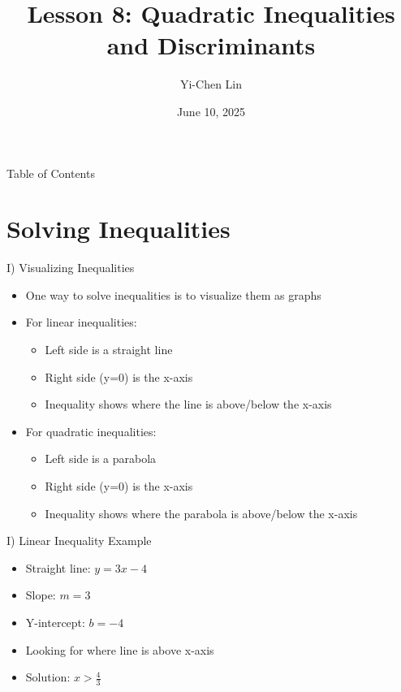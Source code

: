 \documentclass[aspectratio=169]{beamer}
\title{Lesson 8: Quadratic Inequalities and Discriminants}
\author{Yi-Chen Lin}
\date{June 10, 2025}
\begin{document}
\begin{frame}
    \titlepage
\end{frame}

\begin{frame}{Table of Contents}
    \tableofcontents
\end{frame}

\section{Solving Inequalities}

\begin{frame}{I) Visualizing Inequalities}
    \begin{tcolorbox}[colback=lightgray,colframe=primary,title=Key Concept]
        \footnotesize
        \begin{itemize}
            \item One way to solve inequalities is to visualize them as graphs
            \item For linear inequalities:
            \begin{itemize}
                \item Left side is a straight line
                \item Right side (y=0) is the x-axis
                \item Inequality shows where the line is above/below the x-axis
            \end{itemize}
            \item For quadratic inequalities:
            \begin{itemize}
                \item Left side is a parabola
                \item Right side (y=0) is the x-axis
                \item Inequality shows where the parabola is above/below the x-axis
            \end{itemize}
        \end{itemize}
    \end{tcolorbox}
\end{frame}

\begin{frame}{I) Linear Inequality Example}
    \begin{tcolorbox}[colback=lightgray,colframe=primary,title=Example: $3x-4>0$]
        \footnotesize
        \begin{itemize}
            \item Straight line: $y=3x-4$
            \item Slope: $m=3$
            \item Y-intercept: $b=-4$
            \item Looking for where line is above x-axis
            \item Solution: $x>\frac{4}{3}$
        \end{itemize}
    \end{tcolorbox}
\end{frame}
\end{document}
